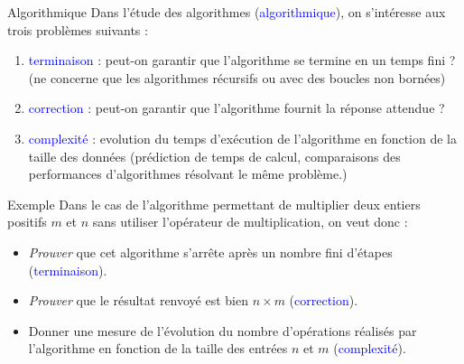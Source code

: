 \documentclass[10pt,french]{beamer}
\begin{document}
\begin{frame}[fragile]{\Ctitle}{\stitle}
	\begin{block}{Algorithmique}
		Dans l'étude des algorithmes (\textcolor{blue}{algorithmique}), on s'intéresse aux trois problèmes suivants :
		\begin{enumerate}
			\item<2-> \textcolor{blue}{terminaison} : peut-on garantir que l'algorithme se termine en un temps fini ? (ne concerne que les algorithmes récursifs ou avec des boucles non bornées)
			\item<3-> \textcolor{blue}{correction} : peut-on garantir que l'algorithme fournit la réponse attendue ?
			\item<4-> \textcolor{blue}{complexité} : evolution du temps d'exécution de l'algorithme en fonction de la taille des données (prédiction de temps de calcul, comparaisons des performances d'algorithmes résolvant le même problème.)
		\end{enumerate}
	\end{block}
\end{frame}

\begin{frame}[fragile]{\Ctitle}{\stitle}
	\begin{exampleblock}{Exemple}
		Dans le cas de l'algorithme permettant de multiplier deux entiers positifs $m$ et $n$ sans utiliser l'opérateur de multiplication, on veut donc :
		\begin{itemize}
		\item<2-> \textit{Prouver} que cet algorithme s'arrête après un nombre fini d'étapes  (\textcolor{blue}{terminaison}).
		\item<3-> \textit{Prouver} que le résultat renvoyé est bien $n\times m$ (\textcolor{blue}{correction}).
		\item<4-> Donner une mesure de l'évolution du nombre d'opérations réalisés par l'algorithme en fonction de la taille des entrées $n$ et $m$ (\textcolor{blue}{complexité}).
		\end{itemize}
	\end{exampleblock}
\end{frame}
\end{document}
